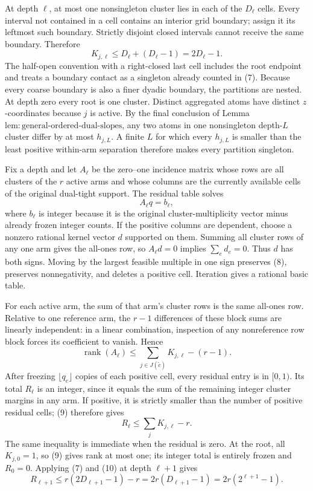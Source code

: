 At depth \(\ell\), at most one nonsingleton cluster lies in each of the \(D_\ell\) cells.  Every interval not contained in a cell contains an interior grid boundary; assign it its leftmost such boundary.  Strictly disjoint closed intervals cannot receive the same boundary.  Therefore
\[
 K_{j,\ell}\le D_\ell+(D_\ell-1)=2D_\ell-1. \tag{7}
\]
The half-open convention with a right-closed last cell includes the root endpoint and treats a boundary contact as a singleton already counted in (7).  Because every coarse boundary is also a finer dyadic boundary, the partitions are nested.  At depth zero every root is one cluster.  Distinct aggregated atoms have distinct \(z\)-coordinates because \(j\) is active.  By the final conclusion of Lemma \(\mathrm{lem{:}general\mbox{-}ordered\mbox{-}dual\mbox{-}slopes}\), any two atoms in one nonsingleton depth-\(L\) cluster differ by at most \(h_{j,L}\).  A finite \(L\) for which every \(h_{j,L}\) is smaller than the least positive within-arm separation therefore makes every partition singleton.

Fix a depth and let \(A_\ell\) be the zero--one incidence matrix whose rows are all clusters of the \(r\) active arms and whose columns are the currently available cells of the original dual-tight support.  The residual table solves
\[
 A_\ell q=b_\ell, \tag{8}
\]
where \(b_\ell\) is integer because it is the original cluster-multiplicity vector minus already frozen integer counts.  If the positive columns are dependent, choose a nonzero rational kernel vector \(d\) supported on them.  Summing all cluster rows of any one arm gives the all-ones row, so \(A_\ell d=0\) implies \(\sum_e d_e=0\).  Thus \(d\) has both signs.  Moving by the largest feasible multiple in one sign preserves (8), preserves nonnegativity, and deletes a positive cell.  Iteration gives a rational basic table.

For each active arm, the sum of that arm's cluster rows is the same all-ones row.  Relative to one reference arm, the \(r-1\) differences of these block sums are linearly independent: in a linear combination, inspection of any nonreference row block forces its coefficient to vanish.  Hence
\[
 \operatorname{rank}(A_\ell)
 \le\sum_{j\in J(\widetilde c)}K_{j,\ell}-(r-1). \tag{9}
\]
After freezing \(\lfloor q_e\rfloor\) copies of each positive cell, every residual entry is in \([0,1)\).  Its total \(R_\ell\) is an integer, since it equals the sum of the remaining integer cluster margins in any arm.  If positive, it is strictly smaller than the number of positive residual cells; (9) therefore gives
\[
 R_\ell\le\sum_jK_{j,\ell}-r. \tag{10}
\]
The same inequality is immediate when the residual is zero.  At the root, all \(K_{j,0}=1\), so (9) gives rank at most one; its integer total is entirely frozen and \(R_0=0\).  Applying (7) and (10) at depth \(\ell+1\) gives
\[
 R_{\ell+1}
 \le r(2D_{\ell+1}-1)-r
 =2r(D_{\ell+1}-1)
 =2r(2^{\ell+1}-1). \tag{11}
\]

